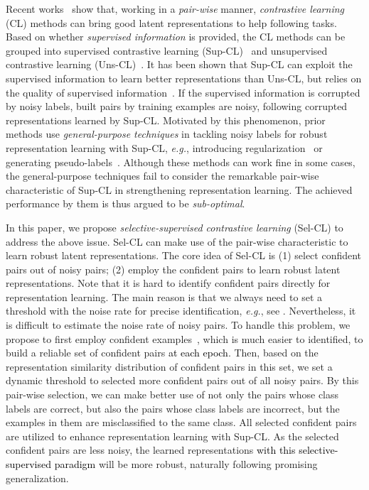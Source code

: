 \documentclass[10pt,twocolumn,letterpaper]{article}
\begin{document}
Recent works~\cite{chen2020big,chen2020simple,He0WXG20,Ghosh2021,Zheltonozhskii2021} show that, working in a \textit{pair-wise} manner, \textit{contrastive learning} (CL) methods can bring good latent representations to help following tasks. Based on whether \textit{supervised information} is provided, the CL methods can be grouped into supervised contrastive learning (Sup-CL)~\cite{Khosla2020} and unsupervised contrastive learning (Uns-CL)~\cite{chen2020big,chen2020simple,He0WXG20}. It has been shown that Sup-CL can exploit the supervised information to learn better representations than Uns-CL, but relies on the quality of supervised information~\cite{Ortego2021}. If the supervised information is corrupted by noisy labels, built pairs by training examples are noisy, following corrupted representations learned by Sup-CL. Motivated by this phenomenon, prior methods use \textit{general-purpose techniques} in tackling noisy labels for robust representation learning with Sup-CL, \textit{e.g.}, introducing regularization~\cite{Ortego2021} or generating pseudo-labels~\cite{Li2021ICLR}. Although these methods can work fine in some cases, the general-purpose techniques fail to consider the remarkable pair-wise characteristic of Sup-CL in strengthening representation learning. The achieved performance by them is thus argued to be \textit{sub-optimal}. 

In this paper, we propose \textit{selective-supervised contrastive learning} (Sel-CL) to address the above issue. Sel-CL can make use of the pair-wise characteristic to learn robust latent representations. The core idea of Sel-CL is (1) select confident pairs out of noisy pairs; (2) employ the confident pairs to learn robust latent representations. Note that it is hard to identify confident pairs directly for representation learning. The main reason is that we always need to set a threshold with the noise rate for precise identification, \textit{e.g.}, see \cite{Jiang2018icml,Han2018NIPS,han2020sigua}. Nevertheless, it is difficult to estimate the noise rate of noisy pairs. To handle this problem, we propose to first employ confident examples~\cite{Ortego2021,Han2018NIPS}, which is much easier to identified, to build a reliable set of confident pairs \textcolor{black}{at each epoch}. Then, based on the representation similarity distribution of confident pairs in this set, we set a dynamic threshold to selected more confident pairs out of all noisy pairs. By this pair-wise selection, we can make better use of not only the pairs whose class labels are correct, but also the pairs whose class labels are incorrect, but the examples in them are misclassified to the same class. All selected confident pairs are utilized to enhance representation learning with Sup-CL. 
As the selected confident pairs are less noisy, the learned representations \textcolor{black}{with this selective-supervised paradigm} will be more robust, naturally following promising generalization.
\end{document}
